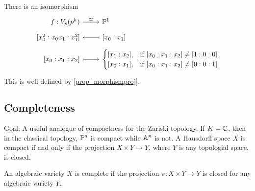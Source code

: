 \documentclass[a4paper,11pt]{article}
\begin{document}
{				\begin{remark}
					There is an isomorphism
					\begin{equation*}
						\begin{tikzcd}[row sep=tiny,
							/tikz/column 1/.append style={nodes={anchor=base east}},
							/tikz/column 2/.append style={nodes={anchor=base west}},
							ampersand replacement=\&]
							f:V_p(p^h)\ar[r,"\simeq"] \& \P^1\\
							{[x_0^2:x_0x_1:x_1^2]} \& \ar[l,mapsto] [x_0:x_1]\\
							{[x_0:x_1:x_2]}\ar[r,mapsto] \& 
							\begin{cases}
								[x_1:x_2], & \text{if }[x_0:x_1:x_2]\neq[1:0:0]\\
								[x_0:x_1], & \text{if }	[x_0:x_1:x_2]\neq[0:0:1]
							\end{cases}
						\end{tikzcd}
					\end{equation*}
					This is well-defined by \autoref{prop--morphismproj}.
				\end{remark}
			
			}

		

		\subsection{Completeness}
			
			Goal: A useful analogue of compactness for the Zariski topology. If $K=\CC$, then in the classical topology, $\P^n$ is compact while $\AA^n$ is not.
			A Hausdorff space $X$ is compact if and only if the projection $X\times Y\rightarrow Y$, where $Y$ is any topologial space, is closed.

			\begin{defi}
				An algebraic variety $X$ is complete if the projection $\pi:X\times Y\rightarrow Y$ is closed for any algebraic variety $Y$.
			\end{defi}
\end{document}
